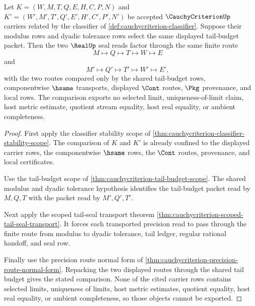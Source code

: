 \begin{theorem}
\label{thm:cauchycriterion-shared-tail-budget-seal-comparison}
Let $K=(W,M,T,Q,E,H,C,P,N)$ and $K'=(W',M',T',Q',E',H',C',P',N')$ be accepted $\CauchyCriterionUp$ carriers related by the classifier of \autoref{def:cauchycriterion-classifier}. Suppose their modulus rows and dyadic tolerance rows select the same displayed tail-budget packet. Then the two $\RealUp$ seal reads factor through the same finite route
$$
M \longmapsto Q \longmapsto T \longmapsto W \longmapsto E
$$
and
$$
M' \longmapsto Q' \longmapsto T' \longmapsto W' \longmapsto E',
$$
with the two routes compared only by the shared tail-budget rows, componentwise $\hsame$ transports, displayed $\Cont$ routes, $\Pkg$ provenance, and local \NameCert{} rows. The comparison exports no selected limit, uniqueness-of-limit claim, host metric estimate, quotient stream equality, host real equality, or ambient completeness.
\end{theorem}
\begin{proof}
First apply the classifier stability scope of \autoref{thm:cauchycriterion-classifier-stability-scope}. The comparison of $K$ and $K'$ is already confined to the displayed carrier rows, the componentwise $\hsame$ rows, the $\Cont$ routes, provenance, and local certificates.

Use the tail-budget scope of \autoref{thm:cauchycriterion-tail-budget-scope}. The shared modulus and dyadic tolerance hypothesis identifies the tail-budget packet read by $M,Q,T$ with the packet read by $M',Q',T'$.

Next apply the scoped tail-seal transport theorem \autoref{thm:cauchycriterion-scoped-tail-seal-transport}. It forces each transported precision read to pass through the finite route from modulus to dyadic tolerance, tail ledger, regular rational handoff, and seal row.

Finally use the precision route normal form of \autoref{thm:cauchycriterion-precision-route-normal-form}. Repacking the two displayed routes through the shared tail budget gives the stated comparison. None of the cited carrier rows contains selected limits, uniqueness of limits, host metric estimates, quotient equality, host real equality, or ambient completeness, so those objects cannot be exported.
\end{proof}

